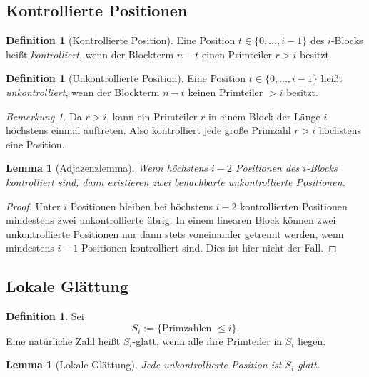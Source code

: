 \documentclass[12pt,a4paper]{article}
\theoremstyle{plain}
\newtheorem{lemma}[theorem]{Lemma}
\theoremstyle{definition}
\newtheorem{definition}[theorem]{Definition}
\theoremstyle{remark}
\newtheorem{remark}[theorem]{Bemerkung}
\begin{document}
	\subsection{Kontrollierte Positionen}
	
	\begin{definition}[Kontrollierte Position]
		Eine Position \(t\in\{0,\dots,i-1\}\) des \(i\)-Blocks heißt \emph{kontrolliert}, wenn der Blockterm \(n-t\) einen Primteiler \(r>i\) besitzt.
	\end{definition}
	
	\begin{definition}[Unkontrollierte Position]
		Eine Position \(t\in\{0,\dots,i-1\}\) heißt \emph{unkontrolliert}, wenn der Blockterm \(n-t\) keinen Primteiler \(>i\) besitzt.
	\end{definition}
	
	\begin{remark}
		Da \(r>i\), kann ein Primteiler \(r\) in einem Block der Länge \(i\) höchstens einmal auftreten. Also kontrolliert jede große Primzahl \(r>i\) höchstens eine Position.
	\end{remark}
	
	\begin{lemma}[Adjazenzlemma]
		\label{lem:adjacency}
		Wenn höchstens \(i-2\) Positionen des \(i\)-Blocks kontrolliert sind, dann existieren zwei benachbarte unkontrollierte Positionen.
	\end{lemma}
	
	\begin{proof}
		Unter \(i\) Positionen bleiben bei höchstens \(i-2\) kontrollierten Positionen mindestens zwei unkontrollierte übrig. In einem linearen Block können zwei unkontrollierte Positionen nur dann stets voneinander getrennt werden, wenn mindestens \(i-1\) Positionen kontrolliert sind. Dies ist hier nicht der Fall.
	\end{proof}
	
	\subsection{Lokale Glättung}
	
	\begin{definition}
		Sei
		\[
		S_i:=\{\text{Primzahlen } \le i\}.
		\]
		Eine natürliche Zahl heißt \(S_i\)-glatt, wenn alle ihre Primteiler in \(S_i\) liegen.
	\end{definition}
	
	\begin{lemma}[Lokale Glättung]
		\label{lem:local-smoothing}
		Jede unkontrollierte Position ist \(S_i\)-glatt.
	\end{lemma}
	
\end{document}
